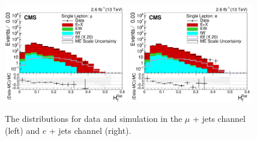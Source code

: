 \begin{figure}[ht!]
    \includegraphics[width=0.48\textwidth]{images/Run2/HTRat_StackLogY.pdf}
    \includegraphics[width=0.48\textwidth]{images/Run2/HTRat_StackLogY_e.pdf}
    \caption{The \HTrat distributions for data and simulation in the $\mu$ + jets channel (left) and $e$ + jets channel (right).}
    \label{fig:HTRat}
\end{figure}





